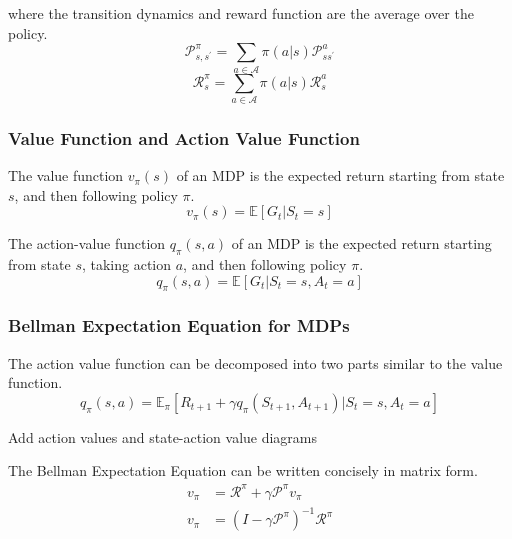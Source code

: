 where the transition dynamics and reward function are the average over the policy.
\[
    \mathcal{P}_{s,s^{\prime}}^{\pi} = \sum_{a \in \mathcal{A} } \pi (a|s) \mathcal{P}_{ss^{\prime}}^{a}  
\]
\[
    \mathcal{R}_{s}^{\pi} = \sum_{a \in \mathcal{A} } \pi (a|s) \mathcal{R}_{s}^{a}
\]

\subsubsection{Value Function and Action Value Function}
\begin{definition}
    The value function \(v_{\pi} (s)\) of an MDP is the expected return starting from state \(s\),
    and then following policy \(\pi \).
    \[
        v_{\pi} (s) = \mathbb{E}  [ G_{t} | S_{t} = s]  
    \]
\end{definition}
\begin{definition}
    The action-value function \(q_{\pi} (s, a)\) of an MDP is the expected return starting from state \(s\),
    taking action \(a\), and then following policy \(\pi \).
    \[
        q_{\pi} (s, a) = \mathbb{E}  [ G_{t} | S_{t} = s, A_{t} = a]  
    \] 
\end{definition}

\subsubsection{Bellman Expectation Equation for MDPs}
The action value function can be decomposed into two parts similar to the value function.
\[
        q_{\pi} (s, a) = \mathbb{E} _\pi \left[    R_{t+1} + \gamma q_\pi (S_{t+1} , A_{t+1} ) | 
        S_t = s, A_t = a \right]
\]

\begin{note}
    Add action values and state-action value diagrams
\end{note}
The Bellman Expectation Equation can be written concisely in matrix form.
\[
    \begin{aligned}
        v_{\pi} &= \mathcal{R} ^{\pi} + \gamma \mathcal{P} ^{\pi} v_{\pi}  \\
        v_{\pi} &= \left( 
            I - \gamma \mathcal{P} ^{\pi}
         \right) ^{-1} \mathcal{R} ^{\pi}  \\
    \end{aligned}
\]

